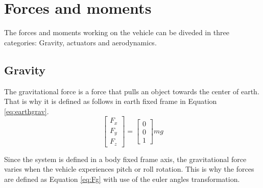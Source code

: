 

\section{Forces and moments}
The forces and moments working on the vehicle can be diveded in three categories: Gravity, actuators and aerodynamics. 

\subsection{Gravity}
The gravitational force is a force that pulls an object towards the center of earth. That is why it is defined as follows in earth fixed frame in Equation \ref{eq:earthgrav}. 
\begin{equation} \label{eq:earthgrav}
\begin{bmatrix}
F_x\\
F_y\\
F_z
\end{bmatrix} = \begin{bmatrix}
0\\0\\1
\end{bmatrix} mg
\end{equation}

Since the system is defined in a body fixed frame axis, the gravitational force varies when the vehicle experiences pitch or roll rotation. This is why the forces are defined as Equation \ref{eq:Fg} with use of the euler angles transformation.

